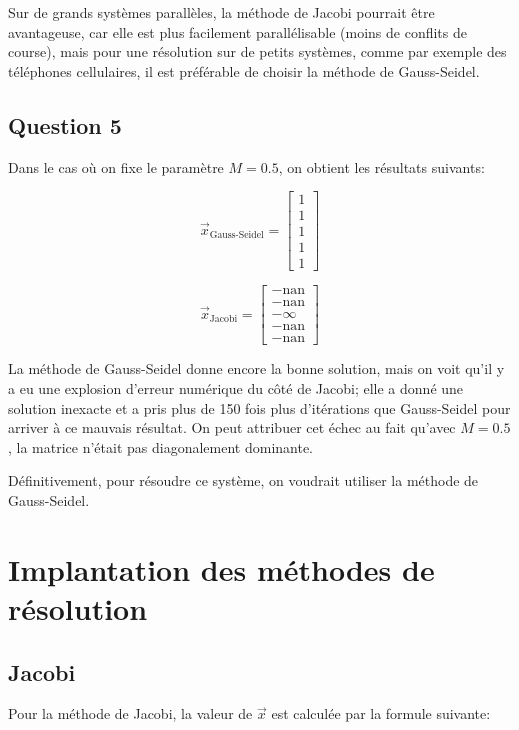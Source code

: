 \documentclass[10pt]{article}
\begin{document}
Sur de grands systèmes parallèles, la méthode de Jacobi pourrait être
avantageuse, car elle est plus facilement parallélisable (moins de
conflits de course), mais pour une résolution sur de petits systèmes,
comme par exemple des téléphones cellulaires, il est préférable de
choisir la méthode de Gauss-Seidel.

\subsection{Question 5}

Dans le cas où on fixe le paramètre $M=0.5$, on obtient les résultats
suivants:

\[
\vec{x}_{\text{Gauss-Seidel}} = \begin{bmatrix}
  1 \\ 1 \\ 1 \\ 1 \\ 1
\end{bmatrix} \tag{Itérations: 27}
\]

\[
\vec{x}_{\text{Jacobi}} = \begin{bmatrix}
  -\text{nan} \\
  -\text{nan} \\
  -\infty \\
  -\text{nan} \\
  -\text{nan}
\end{bmatrix} \tag{Itérations: 4687}
\]

La méthode de Gauss-Seidel donne encore la bonne solution, mais on
voit qu'il y a eu une explosion d'erreur numérique du côté de Jacobi;
elle a donné une solution inexacte et a pris plus de 150 fois plus
d'itérations que Gauss-Seidel pour arriver à ce mauvais résultat.  On
peut attribuer cet échec au fait qu'avec $M=0.5$, la matrice n'était
pas diagonalement dominante.

Définitivement, pour résoudre ce système, on voudrait utiliser la
méthode de Gauss-Seidel.


\section{Implantation des méthodes de résolution}

\subsection{Jacobi}

Pour la méthode de Jacobi, la valeur de $\vec{x}$ est calculée par la
formule suivante:
\end{document}
